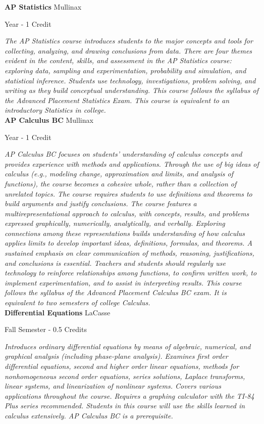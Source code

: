 \noindent\textbf{AP Statistics} \hfill Mullinax

\noindent Year - 1 Credit

\vspace{1mm}\emph{The AP Statistics course introduces students to the major concepts and tools for collecting, analyzing, and drawing conclusions from data. There are four themes evident in the content, skills, and assessment in the AP Statistics course: exploring data, sampling and experimentation, probability and simulation, and statistical inference. Students use technology, investigations, problem solving, and writing as they build conceptual understanding. This course follows the syllabus of the Advanced Placement Statistics Exam. This course is equivalent to an introductory Statistics in college.}\\

\noindent\textbf{AP Calculus BC} \hfill Mullinax

\noindent Year - 1 Credit

\vspace{1mm}\emph{AP Calculus BC focuses on students’ understanding of calculus concepts and provides experience with methods and applications. Through the use of big ideas of calculus (e.g., modeling change, approximation and limits, and analysis of functions), the course becomes a cohesive whole, rather than a collection of unrelated topics. The course requires students to use definitions and theorems to build arguments and justify conclusions. The course features a multirepresentational approach to calculus, with concepts, results, and problems expressed graphically, numerically, analytically, and verbally. Exploring connections among these representations builds understanding of how calculus applies limits to develop important ideas, definitions, formulas, and theorems. A sustained emphasis on clear communication of methods, reasoning, justifications, and conclusions is essential. Teachers and students should regularly use technology to reinforce relationships among functions, to confirm written work, to implement experimentation, and to assist in interpreting results. This course follows the syllabus of the Advanced Placement Calculus BC exam. It is equivalent to two semesters of college Calculus.}\\

\noindent\textbf{Differential Equations} \hfill LaCasse

\noindent Fall Semester - 0.5 Credits

\vspace{1mm}\emph{Introduces ordinary differential equations by means of algebraic, numerical, and graphical analysis (including phase-plane analysis). Examines first order differential equations, second and higher order linear equations, methods for nonhomogeneous second order equations, series solutions, Laplace transforms, linear systems, and linearization of nonlinear systems. Covers various applications throughout the course. Requires a graphing calculator with the TI-84 Plus series recommended. Students in this course will use the skills learned in calculus extensively. AP Calculus BC is a prerequisite.}\\

